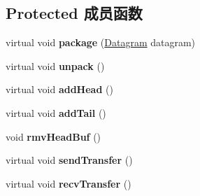 \subsection*{Protected 成员函数}
\begin{DoxyCompactItemize}
\item 
\mbox{\label{class_c_layer_interface_a4bde2a0310c9071cbe7020cc38c97674}} 
virtual void {\bfseries package} (\hyperlink{class_datagram}{Datagram} datagram)
\item 
\mbox{\label{class_c_layer_interface_a94cb2e090328df13a252a2ea40db94d8}} 
virtual void {\bfseries unpack} ()
\item 
\mbox{\label{class_c_layer_interface_ac38c51660960657ac42e37a19ea062b4}} 
virtual void {\bfseries add\+Head} ()
\item 
\mbox{\label{class_c_layer_interface_a433a6f3322355291bbfc2b97343d493f}} 
virtual void {\bfseries add\+Tail} ()
\item 
\mbox{\label{class_c_layer_interface_ac98e8ced890a29b4b76e16cfa3defddb}} 
void {\bfseries rmv\+Head\+Buf} ()
\item 
\mbox{\label{class_c_layer_interface_a02a144b97e69df2dc47149e5314cba2d}} 
virtual void {\bfseries send\+Transfer} ()
\item 
\mbox{\label{class_c_layer_interface_aca72cd6ae77b4e4b4c1d058377583110}} 
virtual void {\bfseries recv\+Transfer} ()
\end{DoxyCompactItemize}
